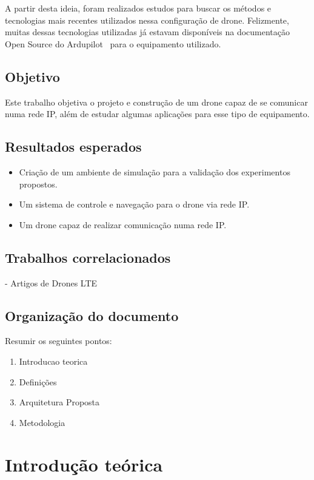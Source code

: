 \documentclass[12pt,a4paper,oneside]{book}
\begin{document}
A partir desta ideia, foram realizados estudos para buscar os métodos e tecnologias mais recentes utilizados nessa configuração de drone. Felizmente, muitas dessas tecnologias utilizadas já estavam disponíveis na documentação Open Source do Ardupilot~\cite{url:ardupilotdoc} para o equipamento utilizado.

\section{Objetivo}

Este trabalho objetiva o projeto e construção de um drone capaz de se comunicar numa rede IP, além de estudar algumas aplicações para esse tipo de equipamento.

\section{Resultados esperados}

\begin{itemize}
\item Criação de um ambiente de simulação para a validação dos experimentos propostos.
\item Um sistema de controle e navegação para o drone via rede IP.
\item Um drone capaz de realizar comunicação numa rede IP.    
\end{itemize}

\section{Trabalhos correlacionados}

 - Artigos de Drones LTE

\section{Organização do documento}
Resumir os seguintes pontos:
\begin{enumerate}
    \item Introducao teorica
    \item Definições
    \item Arquitetura Proposta
    \item Metodologia
\end{enumerate}



%

\chapter{Introdução teórica}
%
\thispagestyle{empty} 
%
\end{document}

